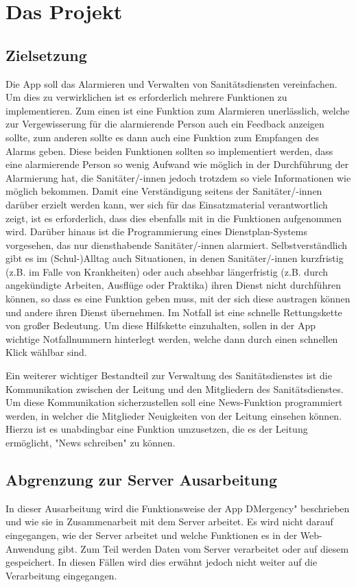 \section{Das Projekt}
\subsection{Zielsetzung}
    Die App soll das Alarmieren und Verwalten von Sanitätsdiensten vereinfachen. Um dies
    zu verwirklichen ist es erforderlich mehrere Funktionen zu implementieren. Zum 
    einen ist eine Funktion zum Alarmieren unerlässlich, welche zur Vergewisserung für
    die alarmierende Person auch ein Feedback anzeigen sollte, zum anderen sollte es 
    dann auch eine Funktion zum Empfangen des Alarms geben. Diese beiden Funktionen 
    sollten so implementiert werden, dass eine alarmierende Person so wenig Aufwand wie 
    möglich in der Durchführung der Alarmierung hat, die Sanitäter/-innen jedoch trotzdem 
    so viele Informationen wie möglich bekommen. Damit eine Verständigung seitens der 
    Sanitäter/-innen darüber erzielt werden kann, wer sich für das Einsatzmaterial 
    verantwortlich zeigt, ist es erforderlich, dass dies ebenfalls mit in die Funktionen 
    aufgenommen wird.
    Darüber hinaus ist die Programmierung eines Dienstplan-Systems vorgesehen, das nur
    diensthabende Sanitäter/-innen alarmiert.
    Selbstverständlich gibt es im (Schul-)Alltag auch Situationen, in denen Sanitäter/-innen
    kurzfristig (z.B. im Falle von Krankheiten) oder auch absehbar längerfristig (z.B.
    durch angekündigte Arbeiten, Ausflüge oder Praktika) ihren Dienst nicht durchführen 
    können, so dass es eine Funktion geben muss, mit der sich diese austragen können und
    andere ihren Dienst übernehmen.
    Im Notfall ist eine schnelle Rettungskette von großer Bedeutung. Um diese Hilfskette
    \cite{Rettungskette} einzuhalten, sollen in der App wichtige Notfallnummern hinterlegt
    werden, welche dann durch einen schnellen Klick wählbar sind.
    
    Ein weiterer wichtiger Bestandteil zur Verwaltung des Sanitätsdienstes 
    ist die Kommunikation zwischen der Leitung und den Mitgliedern des Sanitätsdienstes.
    Um diese Kommunikation sicherzustellen soll eine News-Funktion programmiert werden, 
    in welcher die Mitglieder Neuigkeiten von der Leitung einsehen können.
    Hierzu ist es unabdingbar eine Funktion umzusetzen, die es der Leitung ermöglicht,
    "News schreiben" zu können.

\subsection{Abgrenzung zur Server Ausarbeitung}
    In dieser Ausarbeitung wird die Funktionsweise der App \glqq DMergency" \grqq{} 
    beschrieben und wie sie in Zusammenarbeit mit dem Server arbeitet. Es wird nicht 
    darauf eingegangen, wie der Server arbeitet und welche Funktionen es in der 
    Web-Anwendung gibt. Zum Teil werden Daten vom Server verarbeitet oder auf diesem 
    gespeichert. In diesen Fällen wird dies erwähnt jedoch nicht weiter auf die
    Verarbeitung eingegangen.